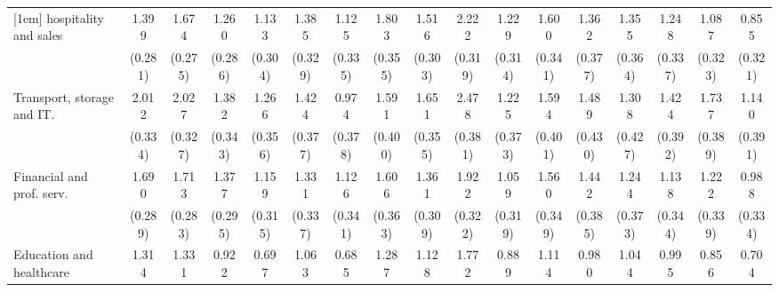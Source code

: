 {\begin{tabular}{l*{16}{c}}
[1em]
hospitality and sales&       1.399\sym{***}&       1.674\sym{***}&       1.260\sym{***}&       1.133\sym{***}&       1.385\sym{***}&       1.125\sym{***}&       1.803\sym{***}&       1.516\sym{***}&       2.222\sym{***}&       1.229\sym{***}&       1.600\sym{***}&       1.362\sym{***}&       1.355\sym{***}&       1.248\sym{***}&       1.087\sym{***}&       0.855\sym{**} \\
                    &     (0.281)         &     (0.275)         &     (0.286)         &     (0.304)         &     (0.329)         &     (0.335)         &     (0.355)         &     (0.303)         &     (0.319)         &     (0.314)         &     (0.341)         &     (0.377)         &     (0.364)         &     (0.337)         &     (0.323)         &     (0.321)         \\
[1em]
Transport, storage and IT.&       2.012\sym{***}&       2.027\sym{***}&       1.382\sym{***}&       1.266\sym{***}&       1.424\sym{***}&       0.974\sym{*}  &       1.591\sym{***}&       1.651\sym{***}&       2.478\sym{***}&       1.225\sym{**} &       1.594\sym{***}&       1.489\sym{***}&       1.308\sym{**} &       1.424\sym{***}&       1.737\sym{***}&       1.140\sym{**} \\
                    &     (0.334)         &     (0.327)         &     (0.343)         &     (0.356)         &     (0.377)         &     (0.378)         &     (0.400)         &     (0.355)         &     (0.381)         &     (0.373)         &     (0.401)         &     (0.430)         &     (0.427)         &     (0.392)         &     (0.389)         &     (0.391)         \\
[1em]
Financial and prof. serv.&       1.690\sym{***}&       1.713\sym{***}&       1.377\sym{***}&       1.159\sym{***}&       1.331\sym{***}&       1.126\sym{***}&       1.606\sym{***}&       1.361\sym{***}&       1.922\sym{***}&       1.059\sym{***}&       1.560\sym{***}&       1.442\sym{***}&       1.244\sym{***}&       1.138\sym{***}&       1.222\sym{***}&       0.988\sym{**} \\
                    &     (0.289)         &     (0.283)         &     (0.295)         &     (0.315)         &     (0.337)         &     (0.341)         &     (0.363)         &     (0.309)         &     (0.322)         &     (0.319)         &     (0.349)         &     (0.385)         &     (0.373)         &     (0.344)         &     (0.339)         &     (0.334)         \\
[1em]
Education and healthcare&       1.314\sym{***}&       1.331\sym{***}&       0.922\sym{**} &       0.697\sym{*}  &       1.063\sym{**} &       0.685\sym{*}  &       1.287\sym{***}&       1.128\sym{***}&       1.772\sym{***}&       0.889\sym{**} &       1.114\sym{**} &       0.980\sym{*}  &       1.044\sym{**} &       0.995\sym{**} &       0.856\sym{*}  &       0.704\sym{*}  \\

\end{tabular}}
